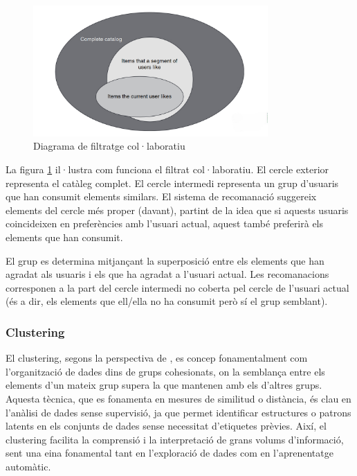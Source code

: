 \documentclass[a4paper,12pt]{report}
\begin{document}
\begin{figure}[h]
    \centering
    \includegraphics[width=0.8\textwidth]{Figuras/DiagramaFiltratgeCol.jpg}
    \caption{Diagrama de filtratge col·laboratiu \cite{falk2019practical}}
    \label{fig:collaborative-filtering-diagram}
\end{figure}

La figura \ref{fig:collaborative-filtering-diagram} il·lustra com funciona el filtrat col·laboratiu. El cercle exterior representa el catàleg complet. El cercle intermedi representa un grup d'usuaris que han consumit elements similars. El sistema de recomanació suggereix elements del cercle més proper (davant), partint de la idea que si aquests usuaris coincideixen en preferències amb l’usuari actual, aquest també preferirà els elements que han consumit.

El grup es determina mitjançant la superposició entre els elements que han agradat als usuaris i els que ha agradat a l’usuari actual. Les recomanacions corresponen a la part del cercle intermedi no coberta pel cercle de l’usuari actual (és a dir, els elements que ell/ella no ha consumit però sí el grup semblant).


\subsubsection{Clustering}

El clustering, segons la perspectiva de \cite{jain2008data}, es concep fonamentalment com l'organització de dades dins de grups cohesionats, on la semblança entre els elements d'un mateix grup supera la que mantenen amb els d'altres grups.
Aquesta tècnica, que es fonamenta en mesures de similitud o distància, és clau en l’anàlisi de dades sense supervisió, ja que permet identificar estructures o patrons latents en els conjunts de dades sense necessitat d’etiquetes prèvies. Així, el clustering facilita la comprensió i la interpretació de grans volums d’informació, sent una eina fonamental tant en l’exploració de dades com en l’aprenentatge automàtic. 
\end{document}
